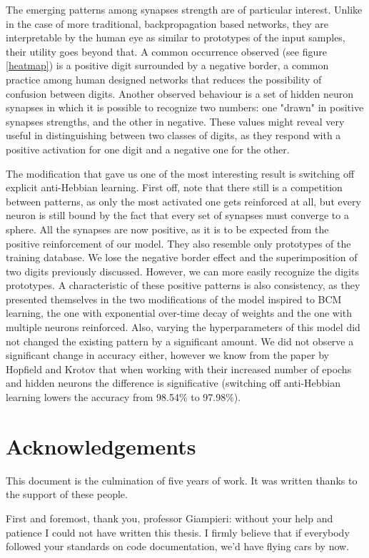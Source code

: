 \documentclass[a4paper]{report}
\begin{document}
The emerging patterns among synapses strength are of particular interest.
Unlike in the case of more traditional, backpropagation based networks, they are interpretable by the human eye as similar to prototypes of the input samples, their utility goes beyond that.
A common occurrence observed (see figure \ref{heatmap}) is a positive digit surrounded by a negative border, a common practice among human designed networks that reduces the possibility of confusion between digits.
Another observed behaviour is a set of hidden neuron synapses in which it is possible to recognize two numbers:
one "drawn" in positive synapses strengths, and the other in negative.
These values might reveal very useful in distinguishing between two classes of digits, as they respond with a positive activation for one digit and a negative one for the other.

The modification that gave us one of the most interesting result is switching off explicit anti-Hebbian learning.
First off, note that there still is a competition between patterns, as only the most activated one gets reinforced at all, but every neuron is still bound by the fact that every set of synapses must converge to a sphere.
All the synapses are now positive, as it is to be expected from the positive reinforcement of our model.
They also resemble only prototypes of the training database.
We lose the negative border effect and the superimposition of two digits previously discussed.
However, we can more easily recognize the digits prototypes.
A characteristic of these positive patterns is also consistency, as they presented themselves in the two modifications of the model inspired to BCM learning, the one with exponential over-time decay of weights and the one with multiple neurons reinforced.
Also, varying the hyperparameters of this model did not changed the existing pattern by a significant amount.
We did not observe a significant change in accuracy either, however we know from the paper by Hopfield and Krotov that when working with their increased number of epochs and hidden neurons the difference is significative (switching off anti-Hebbian learning lowers the accuracy from 98.54\% to 97.98\%).

\chapter{Acknowledgements}
This document is the culmination of five years of work.
It was written thanks to the support of these people.

First and foremost, thank you, professor Giampieri:
without your help and patience I could not have written this thesis.
I firmly believe that if everybody followed your standards on code documentation, we'd have flying cars by now.
\end{document}
